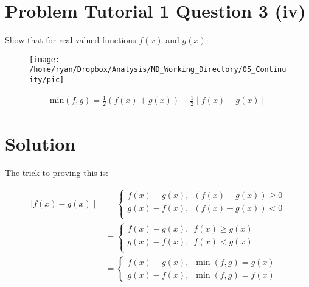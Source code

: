 \documentclass[class=article, crop=false]{standalone}
\begin{document}
\section{Problem {\small Tutorial 1 Question 3 (iv)}}
Show that for real-valued functions $f(x)$ and $g(x)$:

\begin{figure}
	\centering
	\texttt{[image: /home/ryan/Dropbox/Analysis/MD\_Working\_Directory/05\_Continuity/pic]}
	\caption{}
	\label{fig:pic}
\end{figure}



\begin{align}
  \text{min}(f,g) = \frac{1}{2} \left( f\left( x \right) + g\left( x \right) \right) - \frac{1}{2} \mid f\left( x \right) -g\left( x \right) \mid
\end{align}

\section{Solution}

The trick to proving this is:

\begin{align}
  \mid f\left( x \right) -g\left( x \right) \mid &= 
  \begin{cases}
    f\left( x \right) - g\left( x \right) , \enspace
    \left( f\left( x \right) - g\left( x \right) \right) \geq 0\\ 
    g\left( x \right) - f\left( x \right) , \enspace
    \left( f\left( x \right) - g\left( x \right) \right) < 0\\ 
  \end{cases}
  \label{def1} \\
  &= 
  \begin{cases}
    f\left( x \right) - g\left( x \right) , \enspace
    f\left( x \right)   \geq g\left( x \right)\\ 
    g\left( x \right) - f\left( x \right) , \enspace
    f\left( x \right)   < g\left( x \right)\\ 
  \end{cases}
  \label{def2} \\
  &= 
  \begin{cases}
    f\left( x \right) - g\left( x \right) , \enspace
    \min \left( f, g \right) = g\left( x \right) \\
    g\left( x \right) - f\left( x \right) , \enspace
    \min \left( f, g \right) = f\left( x \right)
  \end{cases}
  \label{def3}
\end{align}
\end{document}
